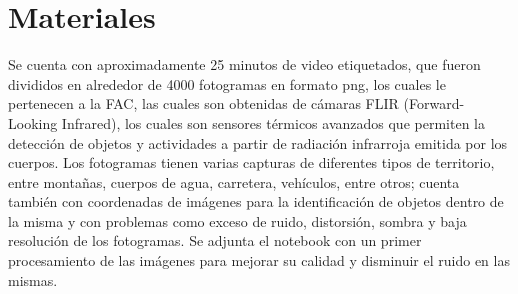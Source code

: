 \section{Materiales}

Se cuenta con aproximadamente 25 minutos de video etiquetados, que fueron divididos en alrededor de 4000 fotogramas en formato png, los cuales le pertenecen a la FAC, las cuales son obtenidas de cámaras FLIR (Forward-Looking Infrared), los cuales son sensores térmicos avanzados que permiten la detección de objetos y actividades a partir de radiación infrarroja emitida por los cuerpos. Los fotogramas tienen varias capturas de diferentes tipos de territorio, entre montañas, cuerpos de agua, carretera, vehículos, entre otros; cuenta también con coordenadas de imágenes para la identificación de objetos dentro de la misma y con problemas como exceso de ruido, distorsión, sombra y baja resolución de los fotogramas. Se adjunta el notebook con un primer procesamiento de las imágenes para mejorar su calidad y disminuir el ruido en las mismas. 